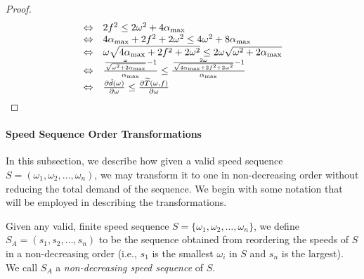 \begin{proof}
\begin{equation}
\begin{array}{ll}
    \Leftrightarrow &  2f^2  \leq  2\omega^2+4\alpha_{\max} \nonumber \\
    \Leftrightarrow &  4\alpha_{\max}+2f^2+2\omega^2  \leq  4\omega^2+8\alpha_{\max} \nonumber \\
    \Leftrightarrow &   \omega \sqrt{4\alpha_{\max}+2f^2+2\omega^2}  \leq  2\omega \sqrt{\omega^2+2\alpha_{\max}} \nonumber \\
    \Leftrightarrow &   \frac{\frac{\omega}{\sqrt{\omega^2+2\alpha_{\max}}}-1}{\alpha_{\max}}  \leq  \frac{\frac{2\omega}{\sqrt{4\alpha_{\max}+2f^2+2\omega^2}}-1}{\alpha_{\max}} \nonumber \\
    \Leftrightarrow &  \frac{\partial \Tilde{d}(\omega)}{\partial \omega}  \leq  \frac{\partial \widetilde{T}(\omega,f)}{\partial \omega}
\end{array}
\end{equation}
\end{proof}

\paragraph{Speed Sequence Order Transformations}
\label{subsec:seq-transform}

In this subsection, we describe how given a valid speed sequence $S = (\omega_1, \omega_2, \ldots, \omega_n)$, we may transform it to one in non-decreasing order without reducing the total demand of the sequence.
 We begin with some notation that will be employed in describing the transformations.


\begin{definition}\label{def:seq-ascending}
Given any valid, finite speed sequence $S = \{\omega_1, \omega_2, \ldots, \omega_n\}$, we define $S_A = (s_1, s_2, \ldots, s_n)$ to be the sequence obtained from reordering the speeds of $S$ in a non-decreasing order (i.e., $s_1$ is the smallest $\omega_i$ in $S$ and $s_n$ is the largest).
 We call $S_A$ a \emph{non-decreasing speed sequence} of $S$.
\end{definition}

